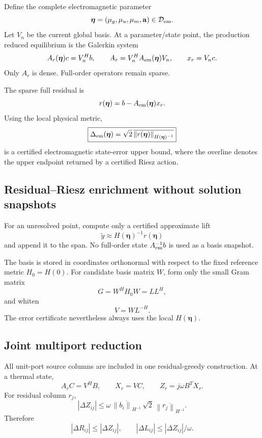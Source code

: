 \documentclass[11pt]{article}
\theoremstyle{remark}
\newcommand{\aT}{\mathbf a}
\newcommand{\etaPar}{\boldsymbol\eta}
\newcommand{\norm}[1]{\left\lVert #1\right\rVert}
\begin{document}
Define the complete electromagnetic parameter
\[
\etaPar=(\mu_g,\mu_u,\mu_m,\aT)\in\mathcal D_{\rm em}.
\]
Let \(V_n\) be the current global basis. At a parameter/state point, the production reduced equilibrium is the Galerkin system
\begin{equation}
A_r(\etaPar)c=V_n^H b,
\qquad
A_r=V_n^HA_{\rm em}(\etaPar)V_n,
\qquad
x_r=V_nc.
\label{eq:em_rom}
\end{equation}
Only \(A_r\) is dense. Full-order operators remain sparse.

The sparse full residual is
\[
r(\etaPar)=b-A_{\rm em}(\etaPar)x_r.
\]
Using the local physical metric,
\begin{equation}
\boxed{
\Delta_{\rm em}(\etaPar)
=\sqrt2\,\overline{\norm{r(\etaPar)}_{H(\etaPar)^{-1}}}
}
\label{eq:em_rom_certificate}
\end{equation}
is a certified electromagnetic state-error upper bound, where the overline denotes the upper endpoint returned by a certified Riesz action.

\subsection{Residual--Riesz enrichment without solution snapshots}
For an unresolved point, compute only a certified approximate lift
\[
\widetilde y\approx H(\etaPar)^{-1}r(\etaPar)
\]
and append it to the span. No full-order state \(A_{\rm em}^{-1}b\) is used as a basis snapshot.

The basis is stored in coordinates orthonormal with respect to the fixed reference metric \(H_0=H(0)\). For candidate basis matrix \(W\), form only the small Gram matrix
\[
G=W^HH_0W=LL^H,
\]
and whiten
\[
V=WL^{-H}.
\]
The error certificate nevertheless always uses the local \(H(\etaPar)\).

\subsection{Joint multiport reduction}
All unit-port source columns are included in one residual-greedy construction. At a thermal state,
\[
A_rC=V^HB,
\qquad
X_r=VC,
\qquad
Z_r=j\omega B^TX_r.
\]
For residual column \(r_j\),
\begin{equation}
|\Delta Z_{ij}|
\le
\omega\,\overline{\norm{b_i}_{H^{-1}}}\,
\sqrt2\,\overline{\norm{r_j}_{H^{-1}}}.
\label{eq:Z_rom_bound}
\end{equation}
Therefore
\[
|\Delta R_{ij}|\le|\Delta Z_{ij}|,
\qquad
|\Delta L_{ij}|\le|\Delta Z_{ij}|/\omega.
\]
\end{document}
